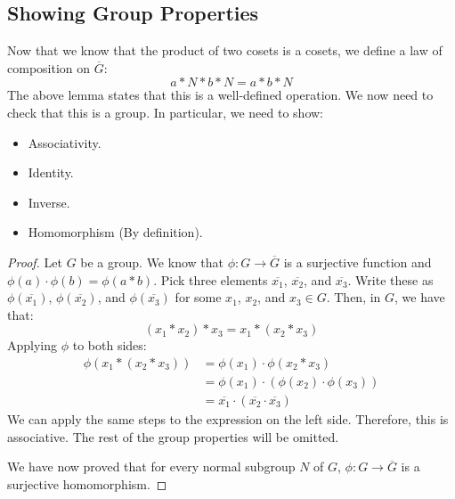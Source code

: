 \documentclass[letterpaper]{article}
\begin{document}
\subsection{Showing Group Properties}
Now that we know that the product of two cosets is a cosets, we define a law of composition on $\overline{G}$: 
\[a * N * b * N = a * b * N\]
The above lemma states that this is a well-defined operation. We now need to check that this is a group. In particular, we need to show: 
\begin{itemize}
    \item Associativity.
    \item Identity. 
    \item Inverse. 
    \item Homomorphism (By definition).
\end{itemize}
\begin{mdframed}
    \begin{proof}
        Let $G$ be a group. We know that $\phi: G \to \overline{G}$ is a surjective function and $\phi(a) \cdot \phi(b) = \phi(a * b)$. Pick three elements $\overline{x_1}$, $\overline{x_2}$, and $\overline{x_3}$. Write these as $\phi(\overline{x_1})$, $\phi(\overline{x_2})$, and $\phi(\overline{x_3})$ for some $x_1$, $x_2$, and $x_3 \in G$. Then, in $G$, we have that: 
        \[(x_1 * x_2) * x_3 = x_1 * (x_2 * x_3)\]
        Applying $\phi$ to both sides: 
        \begin{equation*}
            \begin{aligned}
                \phi(x_1 * (x_2 * x_3)) &= \phi(x_1) \cdot \phi(x_2 * x_3) \\ 
                    &= \phi(x_1) \cdot (\phi(x_2) \cdot \phi(x_3)) \\ 
                    &= \overline{x_1} \cdot (\overline{x_2} \cdot \overline{x_3})
            \end{aligned}
        \end{equation*}
        We can apply the same steps to the expression on the left side. Therefore, this is associative. The rest of the group properties will be omitted. 

        \bigskip 

        We have now proved that for every normal subgroup $N$ of $G$, $\phi: G \to \overline{G}$ is a surjective homomorphism. 
    \end{proof}
\end{mdframed}
\end{document}
